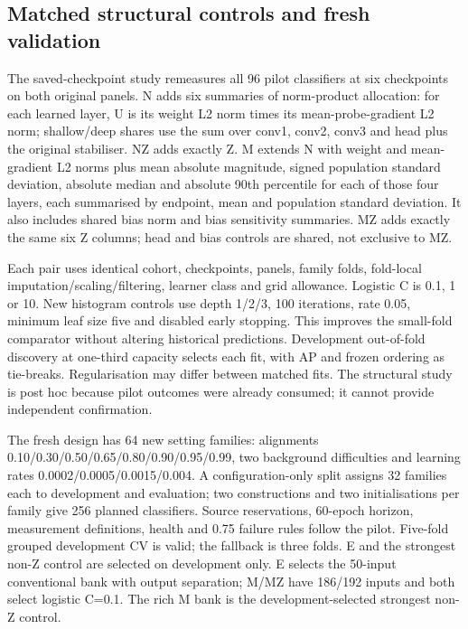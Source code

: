 \subsection{Matched structural controls and fresh validation}

The saved-checkpoint study remeasures all 96 pilot classifiers at six checkpoints on both original panels. N adds six summaries of norm-product allocation: for each learned layer, U is its weight L2 norm times its mean-probe-gradient L2 norm; shallow/deep shares use the sum over conv1, conv2, conv3 and head plus the original stabiliser. NZ adds exactly Z. M extends N with weight and mean-gradient L2 norms plus mean absolute magnitude, signed population standard deviation, absolute median and absolute 90th percentile for each of those four layers, each summarised by endpoint, mean and population standard deviation. It also includes shared bias norm and bias sensitivity summaries. MZ adds exactly the same six Z columns; head and bias controls are shared, not exclusive to MZ.

Each pair uses identical cohort, checkpoints, panels, family folds, fold-local imputation/scaling/filtering, learner class and grid allowance. Logistic C is 0.1, 1 or 10. New histogram controls use depth 1/2/3, 100 iterations, rate 0.05, minimum leaf size five and disabled early stopping. This improves the small-fold comparator without altering historical predictions. Development out-of-fold discovery at one-third capacity selects each fit, with AP and frozen ordering as tie-breaks. Regularisation may differ between matched fits. The structural study is post hoc because pilot outcomes were already consumed; it cannot provide independent confirmation.

The fresh design has 64 new setting families: alignments 0.10/0.30/0.50/0.65/0.80/0.90/0.95/0.99, two background difficulties and learning rates 0.0002/0.0005/0.0015/0.004. A configuration-only split assigns 32 families each to development and evaluation; two constructions and two initialisations per family give 256 planned classifiers. Source reservations, 60-epoch horizon, measurement definitions, health and 0.75 failure rules follow the pilot. Five-fold grouped development CV is valid; the fallback is three folds. E and the strongest non-Z control are selected on development only. E selects the 50-input conventional bank with output separation; M/MZ have 186/192 inputs and both select logistic C=0.1. The rich M bank is the development-selected strongest non-Z control.

